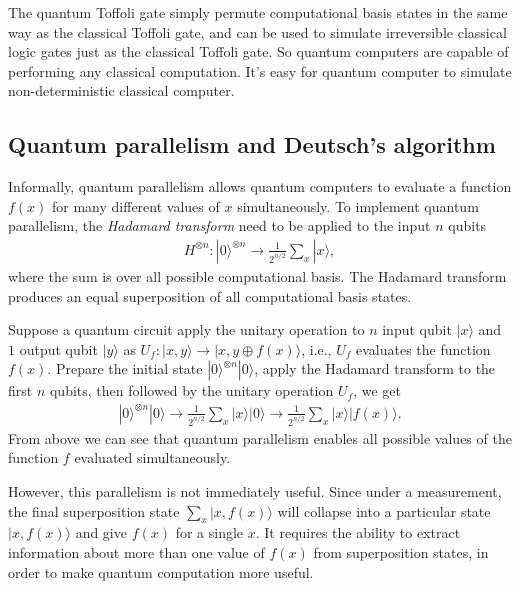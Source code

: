 \documentclass{article}
\newcommand{\ket}[1]{| #1 \rangle}  %
\begin{document}
The quantum Toffoli gate simply permute computational basis states in the same way as the classical Toffoli gate, and can be used to simulate irreversible classical logic gates just as the classical Toffoli gate. So quantum computers are capable of performing any classical computation.
It's easy for quantum computer to simulate non-deterministic classical computer.



\subsection{Quantum parallelism and Deutsch's algorithm}
Informally, quantum parallelism allows quantum computers to evaluate a function $f(x)$ for many different values of $x$ simultaneously. To implement quantum parallelism, the \textit{Hadamard transform} need to be applied to the input $n$ qubits
\begin{align}
	H^{\otimes n}:\ket{0}^{\otimes n} \rightarrow \frac{1}{2^{n/2}}\sum_x \ket{x},
\end{align}
where the sum is over all possible computational basis. The Hadamard transform produces an equal superposition of all computational basis states.

Suppose a quantum circuit apply the unitary operation to $n$ input qubit $\ket{x}$ and $1$ output qubit $\ket{y}$ as $U_f:\ket{x,y} \rightarrow \ket{x,y\oplus f(x)}$, i.e., $U_f$ evaluates the function $f(x)$. Prepare the initial state $\ket{0}^{\otimes n}\ket{0}$, apply the Hadamard transform to the first $n$ qubits, then followed by the unitary operation $U_f$, we get
\begin{align}
	\ket{0}^{\otimes n}\ket{0} \rightarrow \frac{1}{2^{n/2}}\sum_x \ket{x}\ket{0} \rightarrow \frac{1}{2^{n/2}}\sum_x \ket{x}\ket{f(x)}.
\end{align}
From above we can see that quantum parallelism enables all possible values of the function $f$ evaluated simultaneously.

However, this parallelism is not immediately useful. Since under a measurement, the final superposition state $\sum_x \ket{x, f(x)}$ will collapse into a particular state $\ket{x, f(x)}$ and give $f(x)$ for a single $x$. It requires the ability to extract information about more than one value of $f(x)$ from superposition states, in order to make quantum computation more useful.
\end{document}
